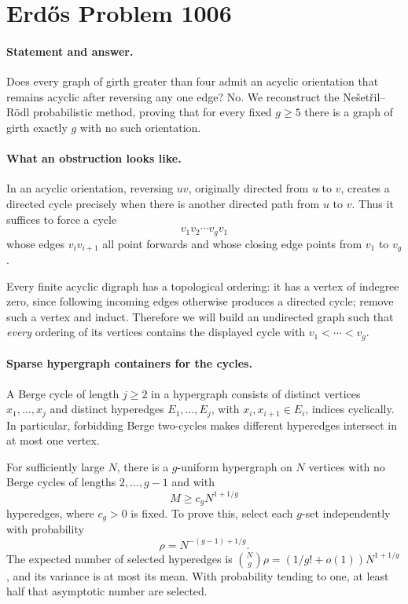 \section*{Erd\H{o}s Problem 1006}

\paragraph{Statement and answer.}
Does every graph of girth greater than four admit an acyclic orientation that remains acyclic after reversing any one edge? No. We reconstruct the Ne\v{s}et\v{r}il--R\"odl probabilistic method, proving that for every fixed \(g\geq5\) there is a graph of girth exactly \(g\) with no such orientation.

\paragraph{What an obstruction looks like.}
In an acyclic orientation, reversing \(uv\), originally directed from \(u\) to \(v\), creates a directed cycle precisely when there is another directed path from \(u\) to \(v\). Thus it suffices to force a cycle
\[
 v_1v_2\cdots v_gv_1
\]
whose edges \(v_iv_{i+1}\) all point forwards and whose closing edge points from \(v_1\) to \(v_g\).

Every finite acyclic digraph has a topological ordering: it has a vertex of indegree zero, since following incoming edges otherwise produces a directed cycle; remove such a vertex and induct. Therefore we will build an undirected graph such that \emph{every} ordering of its vertices contains the displayed cycle with \(v_1<\cdots<v_g\).

\paragraph{Sparse hypergraph containers for the cycles.}
A Berge cycle of length \(j\geq2\) in a hypergraph consists of distinct vertices \(x_1,\ldots,x_j\) and distinct hyperedges \(E_1,\ldots,E_j\), with \(x_i,x_{i+1}\in E_i\), indices cyclically. In particular, forbidding Berge two-cycles makes different hyperedges intersect in at most one vertex.

For sufficiently large \(N\), there is a \(g\)-uniform hypergraph on \(N\) vertices with no Berge cycles of lengths \(2,\ldots,g-1\) and with
\[
 M\geq c_gN^{1+1/g}
\tag{1}
\]
hyperedges, where \(c_g>0\) is fixed. To prove this, select each \(g\)-set independently with probability
\[
 \rho=N^{-(g-1)+1/g}.
\]
The expected number of selected hyperedges is
\(\binom Ng\rho=(1/g!+o(1))N^{1+1/g}\), and its variance is at most its mean. With probability tending to one, at least half that asymptotic number are selected.

